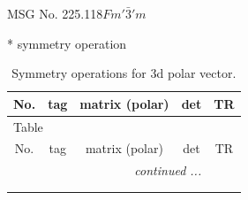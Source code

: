 \documentclass[fleqn,8pt]{jsarticle}
\begin{document}
\setcounter{MaxMatrixCols}{32}

\renewcommand{\tablename}{Table~}
\renewcommand{\figurename}{Figure~}
\begin{center}
\LARGE
MSG No. 225.118\quad$Fm'\bar{3}'m$
\end{center}
* symmetry operation
\renewcommand{\arraystretch}{1.3}
\begin{longtable}{ccccc}
\caption{Symmetry operations for 3d polar vector.}
 \\
 \hline \hline
No. & tag & matrix (polar) & det & TR \\ \hline \endfirsthead

\multicolumn{4}{l}{\tablename\ \thetable{}} \\
 \hline \hline
No. & tag & matrix (polar) & det & TR \\ \hline \endhead

 \hline \hline
\multicolumn{4}{r}{\footnotesize\it continued ...} \\ \endfoot

 \hline \hline
\multicolumn{4}{r}{} \\ \endlastfoot


\end{longtable}
\end{document}
